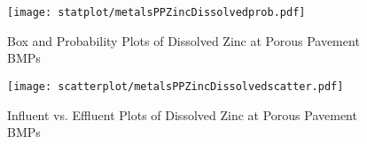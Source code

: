         \begin{figure}[hb]   %
            \centering
            \texttt{[image: statplot/metalsPPZincDissolvedprob.pdf]}
            \caption{Box and Probability Plots of Dissolved Zinc at Porous Pavement BMPs}
        \end{figure}         %
        
        
        \begin{figure}[hb]   %
            \centering
            \texttt{[image: scatterplot/metalsPPZincDissolvedscatter.pdf]}
            \caption{Influent vs. Effluent Plots of Dissolved Zinc at Porous Pavement BMPs}
        \end{figure}         %
        \clearpage
        